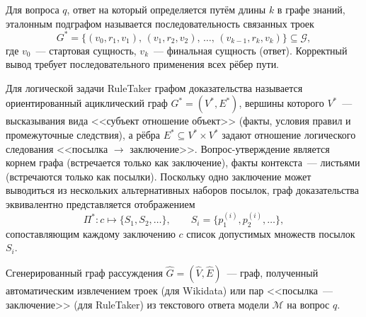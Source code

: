 \begin{definition}
    \label{def:kg-path}
    Для вопроса $q$, ответ на который определяется путём длины $k$ в графе знаний, эталонным подграфом называется последовательность связанных троек
    \[
        G^* = \big\{(v_0, r_1, v_1),\, (v_1, r_2, v_2),\, \ldots,\, (v_{k-1}, r_k, v_k)\big\} \subseteq \mathcal{G},
    \]
    где $v_0$~--- стартовая сущность, $v_k$~--- финальная сущность (ответ). Корректный вывод требует последовательного применения всех рёбер пути.
\end{definition}

\begin{definition}
    \label{def:proof-graph}
    Для логической задачи RuleTaker графом доказательства называется ориентированный ациклический граф $G^* = (V^*, E^*)$, вершины которого $V^*$~--- высказывания вида <<субъект отношение объект>> (факты, условия правил и промежуточные следствия), а рёбра $E^* \subseteq V^* \times V^*$ задают отношение логического следования <<посылка $\rightarrow$ заключение>>. Вопрос-утверждение является корнем графа (встречается только как заключение), факты контекста~--- листьями (встречаются только как посылки). Поскольку одно заключение может выводиться из нескольких альтернативных наборов посылок, граф доказательства эквивалентно представляется отображением
    \[
        \Pi^* : c \mapsto \{S_1, S_2, \ldots\}, \qquad S_i = \{p^{(i)}_1, p^{(i)}_2, \ldots\},
    \]
    сопоставляющим каждому заключению $c$ список допустимых множеств посылок $S_i$.
\end{definition}

\begin{definition}
    \label{def:generated-graph}
    Сгенерированный граф рассуждения $\hat{G} = (\hat{V}, \hat{E})$~--- граф, полученный автоматическим извлечением троек (для Wikidata) или пар <<посылка~--- заключение>> (для RuleTaker) из текстового ответа модели $\mathcal{M}$ на вопрос $q$.
\end{definition}

